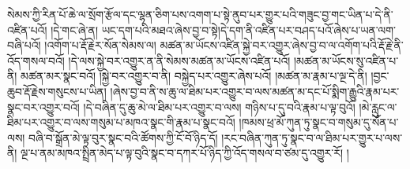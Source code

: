 སེམས་ཀྱི་རིན་པོ་ཆེ་ལ་སྲོག་རྩོལ་དང་ལྷན་ཅིག་པས་འགག་པ་སྟེ་ནུབ་པར་གྱུར་པའི་གཟུང་བྱ་གང་ཡིན་པ་དེ་ནི་འཛིན་པའོ། །དེ་གང་ཞེ་ན། ཡང་དག་པའི་མཐའ་ཞེས་བྱ་བ་སྟེ།དེ་དག་ནི་འཛིན་པར་བཤད་པའོ་ཞེས་པ་ཡན་ལག་བཞི་པའོ། །འགོག་པ་རྡོ་རྗེར་སོན་སེམས་ལ། མཚན་མ་ཡོངས་འཛིན་སྐྱེ་བར་འགྱུར་ཞེས་བྱ་བ་ལ་འགོག་པའི་རྡོ་རྗེ་ནི་འོད་གསལ་བའོ། །དེ་ལས་སྐྱེ་བར་འགྱུར་ན་ནི་སེམས་མཚན་མ་ཡོངས་འཛིན་པའོ། །མཚན་མ་ཡོངས་སུ་འཛིན་པ་ནི། མཚན་མར་སྣང་བའོ། །སྐྱེ་བར་འགྱུར་བ་ནི། བསྐྱེད་པར་འགྱུར་ཞེས་པའོ། །མཚན་མ་རྣམ་པ་ལྔ་དེ་ནི། །བྱང་ཆུབ་རྡོ་རྗེས་གསུངས་པ་ཡིན། །ཞེས་བྱ་བ་ནི་ས་ཆུ་ལ་ཐིམ་པར་འགྱུར་བ་ལས་མཚན་མ་དང་པོ་སྨིག་རྒྱུའི་རྣམ་པར་སྣང་བར་འགྱུར་བའོ། །དེ་བཞིན་དུ་ཆུ་མེ་ལ་ཐིམ་པར་འགྱུར་བ་ལས། གཉིས་པ་དུ་བའི་རྣམ་པ་ལྟ་བུའོ། །མེ་རླུང་ལ་ཐིམ་པར་འགྱུར་བ་ལས་གསུམ་པ་མཁའ་སྣང་གི་རྣམ་པ་སྣང་བའོ། །ཁམས་ཕྲ་མོ་ཀུན་ཏུ་སྣང་བ་གསུམ་དུ་སོན་པ་ལས། བཞི་བ་སྒྲོན་མེ་ལྟ་བུར་སྣང་བའི་ཚོགས་ཀྱི་ངོ་བོ་ཉིད་དོ། །རང་བཞིན་ཀུན་ཏུ་སྣང་བ་ལ་ཐིམ་པར་གྱུར་པ་ལས་ནི། ལྔ་པ་ནམ་མཁའ་སྤྲིན་མེད་པ་ལྟ་བུའི་སྣང་བ་དཀར་པོ་ཉིད་ཀྱི་འོད་གསལ་བ་ཙམ་དུ་འགྱུར་རོ། །
